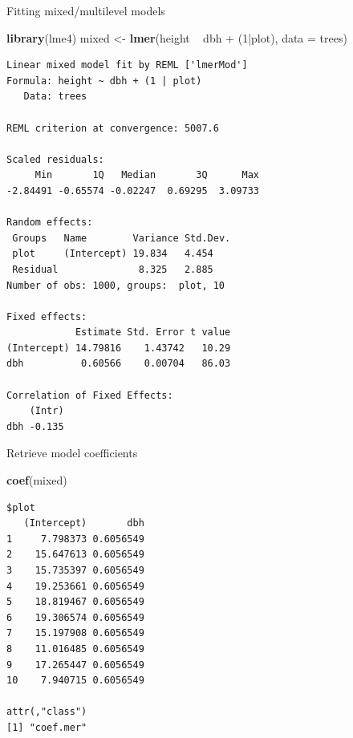 \documentclass[10pt,ignorenonframetext,]{beamer}
\newenvironment{Shaded}{\begin{snugshade}}{\end{snugshade}}
\newcommand{\KeywordTok}[1]{\textcolor[rgb]{0.13,0.29,0.53}{\textbf{{#1}}}}
\newcommand{\DataTypeTok}[1]{\textcolor[rgb]{0.13,0.29,0.53}{{#1}}}
\newcommand{\DecValTok}[1]{\textcolor[rgb]{0.00,0.00,0.81}{{#1}}}
\newcommand{\StringTok}[1]{\textcolor[rgb]{0.31,0.60,0.02}{{#1}}}
\newcommand{\NormalTok}[1]{{#1}}
\begin{document}
\begin{frame}[fragile]{Fitting mixed/multilevel models}

\begin{Shaded}
\begin{Highlighting}[]
\KeywordTok{library}\NormalTok{(lme4)}
\NormalTok{mixed <-}\StringTok{ }\KeywordTok{lmer}\NormalTok{(height ~}\StringTok{ }\NormalTok{dbh +}\StringTok{ }\NormalTok{(}\DecValTok{1}\NormalTok{|plot), }\DataTypeTok{data =} \NormalTok{trees)}
\end{Highlighting}
\end{Shaded}

\begin{verbatim}
Linear mixed model fit by REML ['lmerMod']
Formula: height ~ dbh + (1 | plot)
   Data: trees

REML criterion at convergence: 5007.6

Scaled residuals: 
     Min       1Q   Median       3Q      Max 
-2.84491 -0.65574 -0.02247  0.69295  3.09733 

Random effects:
 Groups   Name        Variance Std.Dev.
 plot     (Intercept) 19.834   4.454   
 Residual              8.325   2.885   
Number of obs: 1000, groups:  plot, 10

Fixed effects:
            Estimate Std. Error t value
(Intercept) 14.79816    1.43742   10.29
dbh          0.60566    0.00704   86.03

Correlation of Fixed Effects:
    (Intr)
dbh -0.135
\end{verbatim}

\end{frame}

\begin{frame}[fragile]{Retrieve model coefficients}

\begin{Shaded}
\begin{Highlighting}[]
\KeywordTok{coef}\NormalTok{(mixed)}
\end{Highlighting}
\end{Shaded}

\begin{verbatim}
$plot
   (Intercept)       dbh
1     7.798373 0.6056549
2    15.647613 0.6056549
3    15.735397 0.6056549
4    19.253661 0.6056549
5    18.819467 0.6056549
6    19.306574 0.6056549
7    15.197908 0.6056549
8    11.016485 0.6056549
9    17.265447 0.6056549
10    7.940715 0.6056549

attr(,"class")
[1] "coef.mer"
\end{verbatim}

\end{frame}
\end{document}
